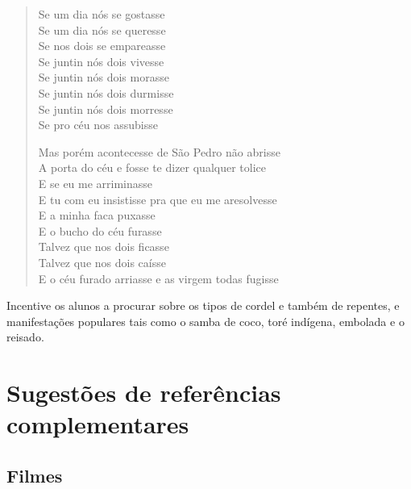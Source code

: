 \documentclass[11pt]{extarticle}
\begin{document}
\begin{verse}
    Se um dia nós se gostasse\\
    Se um dia nós se queresse\\
    Se nos dois se empareasse\\
    Se juntin nós dois vivesse\\
    Se juntin nós dois morasse\\
    Se juntin nós dois durmisse\\
    Se juntin nós dois morresse\\
    Se pro céu nos assubisse\\\medskip

    Mas porém acontecesse de São Pedro não abrisse\\
    A porta do céu e fosse te dizer qualquer tolice\\
    E se eu me arriminasse\\
    E tu com eu insistisse pra que eu me aresolvesse\\
    E a minha faca puxasse\\
    E o bucho do céu furasse\\
    Talvez que nos dois ficasse\\
    Talvez que nos dois caísse\\
    E o céu furado arriasse e as virgem todas fugisse\\
\end{verse}

Incentive os alunos a procurar sobre os tipos de cordel e também de 
repentes, e manifestações populares tais como 
o samba de coco, toré indígena, embolada e o reisado. 

\section{Sugestões de referências complementares}\label{sugestoes}

\subsection{Filmes}
\end{document}
